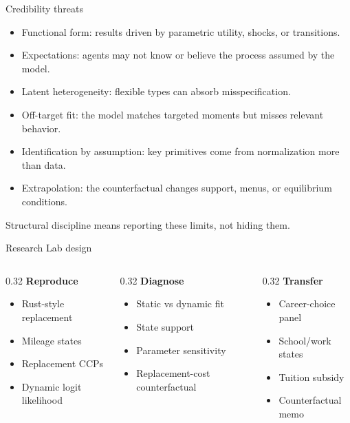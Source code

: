 \documentclass[aspectratio=169,11pt]{beamer}
\newcommand{\1}{\mathbf{1}}
\begin{document}
\begin{frame}{Credibility threats}
\begin{itemize}
    \item Functional form: results driven by parametric utility, shocks, or transitions.
    \item Expectations: agents may not know or believe the process assumed by the model.
    \item Latent heterogeneity: flexible types can absorb misspecification.
    \item Off-target fit: the model matches targeted moments but misses relevant behavior.
    \item Identification by assumption: key primitives come from normalization more than data.
    \item Extrapolation: the counterfactual changes support, menus, or equilibrium conditions.
\end{itemize}

\medskip
Structural discipline means reporting these limits, not hiding them.
\end{frame}

\begin{frame}{Research Lab design}
\begin{columns}[T,onlytextwidth]
\begin{column}{0.32\linewidth}
\textbf{Reproduce}
\begin{itemize}
    \item Rust-style replacement
    \item Mileage states
    \item Replacement CCPs
    \item Dynamic logit likelihood
\end{itemize}
\end{column}
\begin{column}{0.32\linewidth}
\textbf{Diagnose}
\begin{itemize}
    \item Static vs dynamic fit
    \item State support
    \item Parameter sensitivity
    \item Replacement-cost counterfactual
\end{itemize}
\end{column}
\begin{column}{0.32\linewidth}
\textbf{Transfer}
\begin{itemize}
    \item Career-choice panel
    \item School/work states
    \item Tuition subsidy
    \item Counterfactual memo
\end{itemize}
\end{column}
\end{columns}
\end{frame}
\end{document}
